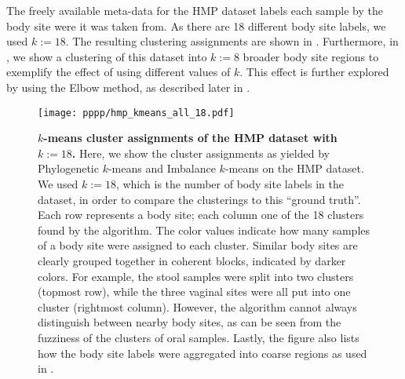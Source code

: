 The freely available meta-data for the \ac{HMP} dataset labels each sample by the body site were it was taken from.
As there are \num{18} different body site labels, we used $k:=18$.
The resulting clustering assignments are shown in .
Furthermore, in ,
we show a clustering of this dataset into $k:=8$ broader body site regions
to exemplify the effect of using different values of $k$.
This effect is further explored by using the Elbow method,
as described later in .

\begin{figure}[hpbt]
    \centering
    \texttt{[image: pppp/hmp\_kmeans\_all\_18.pdf]}
    \begin{subfigure}{0pt}
        \label{fig:hmp_kmeans_all_18:sub:em_unconstr}
    \end{subfigure}
    \begin{subfigure}{0pt}
        \label{fig:hmp_kmeans_all_18:sub:ei_unconstr}
    \end{subfigure}
    \caption[$k$-means cluster assignments of the \acs{HMP} dataset with $k:=18$]{
        \textbf{$k$-means cluster assignments of the \acs{HMP} dataset with $k:=18$.}
        Here, we show the cluster assignments as yielded by
         Phylogenetic $k$-means and
         Imbalance $k$-means on the \ac{HMP} dataset.
        We used $k:=18$, which is the number of body site labels in the dataset,
        in order to compare the clusterings to this ``ground truth''.
        Each row represents a body site; each column one of the 18 clusters found by the algorithm.
        The color values indicate how many samples of a body site were assigned to each cluster.
        Similar body sites are clearly grouped together in coherent blocks, indicated by darker colors.
        For example, the stool samples were split into two clusters (topmost row),
        while the three vaginal sites were all put into one cluster (rightmost column).
        However, the algorithm cannot always distinguish between nearby body sites,
        as can be seen from the fuzziness of the clusters of oral samples.
        Lastly, the figure also lists how the body site labels were aggregated into coarse regions
        as used in .
    }
    \label{fig:hmp_kmeans_all_18}
\end{figure}


